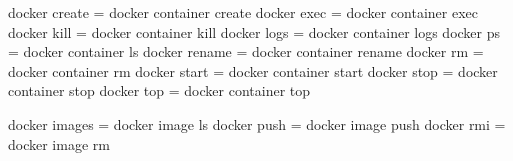 
\begin{bashcode}
docker create = docker container create  
docker exec   = docker container exec    
docker kill   = docker container kill    
docker logs   = docker container logs    
docker ps     = docker container ls      
docker rename = docker container rename
docker rm     = docker container rm      
docker start  = docker container start   
docker stop   = docker container stop    
docker top    = docker container top     

docker images = docker image     ls      
docker push   = docker image     push    
docker rmi    = docker image     rm    
\end{bashcode}
